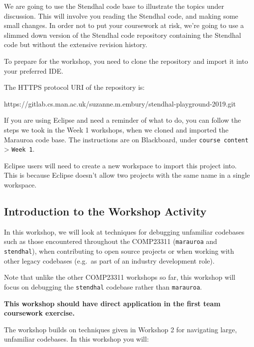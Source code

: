 \documentclass[
]{book}
\newenvironment{Shaded}{\begin{snugshade}}{\end{snugshade}}
\newcommand{\NormalTok}[1]{#1}
\begin{document}
We are going to use the Stendhal code base to illustrate the topics under discussion. This will involve you reading the Stendhal code, and making some small changes. In order not to put your coursework at risk, we're going to use a slimmed down version of the Stendhal code repository containing the Stendhal code but without the extensive revision history.

To prepare for the workshop, you need to clone the repository and import it into your preferred IDE.

The HTTPS protocol URI of the repository is:

\begin{Shaded}
\begin{Highlighting}[]
\NormalTok{https://gitlab.cs.man.ac.uk/suzanne.m.embury/stendhal{-}playground{-}2019.git}
\end{Highlighting}
\end{Shaded}

If you are using Eclipse and need a reminder of what to do, you can follow the steps we took in the Week 1 workshops, when we cloned and imported the Marauroa code base. The instructions are on Blackboard, under \texttt{course\ content} \textgreater{} \texttt{Week\ 1}.

Eclipse users will need to create a new workspace to import this project into. This is because Eclipse doesn't allow two projects with the same name in a single workspace.

\hypertarget{introw}{%
\subsection{Introduction to the Workshop Activity}\label{introw}}

In this workshop, we will look at techniques for debugging unfamiliar codebases such as
those encountered throughout the COMP23311 (\texttt{marauroa} and \texttt{stendhal}), when contributing
to open source projects or when working with other legacy codebases (e.g.~as part of an industry
development role).

Note that unlike the other COMP23311 workshops so far, this workshop will focus on debugging the \texttt{stendhal} codebase rather than \texttt{marauroa}.

\textbf{This workshop should have direct application in the first team coursework exercise.}

The workshop builds on techniques given in Workshop 2 for navigating large, unfamiliar codebases.
In this workshop you will:
\end{document}
